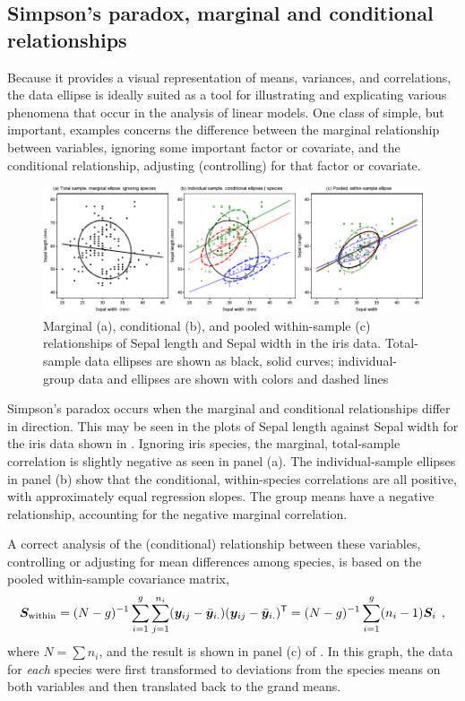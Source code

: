 \subsection{Simpson's paradox, marginal and conditional relationships}\label{sec:simpson-iris}

Because it provides a visual representation of means, variances, and correlations,
the data ellipse is ideally suited as a tool for illustrating and
explicating various
phenomena that occur in the analysis of linear models.
One class of simple, but important, examples concerns the difference between the marginal
relationship between variables, ignoring some important factor or covariate,
and the conditional relationship, adjusting (controlling) for that
factor or covariate.

\begin{figure}[htb]
  \centering
  \includegraphics[width=\textwidth,clip]{fig/contiris3}
  \caption{Marginal (a), conditional (b), and pooled within-sample (c) relationships
  of Sepal length and Sepal width in the iris data. Total-sample data ellipses are
  shown as black, solid curves; individual-group data and ellipses are shown with
  colors and dashed lines}%
  \label{fig:contiris3}
\end{figure}

Simpson's paradox \citep{Simpson:51} occurs when the marginal and
conditional relationships differ in direction. This may be seen in the plots
of Sepal length against Sepal width for the iris data shown in . Ignoring
iris species, the marginal, total-sample correlation is slightly negative
as seen in panel (a). The individual-sample ellipses in panel (b) show
that the conditional, within-species correlations are all positive, with
approximately equal regression slopes.  The group means have a negative
relationship, accounting for the negative marginal correlation.

A correct analysis of the (conditional) relationship between these variables, controlling or adjusting for mean
differences among species, is based on the pooled within-sample covariance matrix,
  \begin{equation} \label{eq:Sp}
  \bm{S}_{\textrm{within}}  = (N - g)^{-1}
  \sum_{i=1}^g
  \sum_{j=1}^{n_i}
  ( \bm{y}_{ij}  -  \bar{\bm{y}}_{i.} )
  ( \bm{y}_{ij}  -  \bar{\bm{y}}_{i.} ) ^\mathsf{T}
  =(N - g)^{-1}
  \sum_{i=1}^g
  (n_i - 1) \bm{S}_i
  \:\: ,
  \end{equation}
where $N = \sum n_i$, and the result
is shown in
panel (c) of .
In this graph, the data for \emph{each} species were first
transformed to deviations from the species means on both variables
and then translated back to the grand means.

